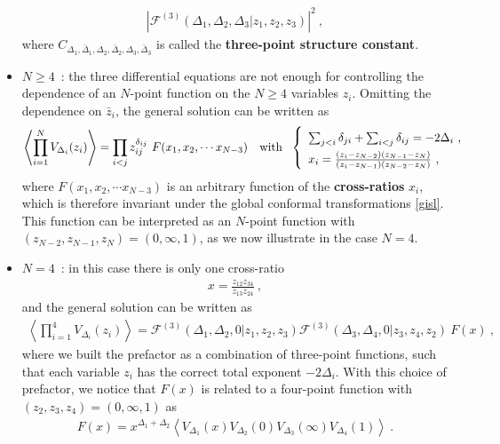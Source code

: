 \documentclass[12pt,a4paper,notitlepage]{report}
\numberwithin{equation}{section}
\theoremstyle{break}
\begin{document}
\begin{itemize}
\begin{align}
 \left|\mathcal{F}^{(3)}(\Delta_1,\Delta_2,\Delta_3|z_1,z_2,z_3)\right|^2\ ,
\label{cff}
\end{align}
where $C_{\Delta_1,\bar{\Delta}_1,\Delta_2,\bar{\Delta}_2,\Delta_3,\bar{\Delta}_3}$ is called the \textbf{\boldmath three-point structure constant}.
\item $\boxed{N\geq 4}$\ : the three differential equations are not enough for controlling the dependence of an $N$-point function on the $N\geq 4$ variables $z_i$.
Omitting the dependence on $\bar{z}_i$, the general solution can be written as 
\begin{align}
 \left\langle\prod_{i=1}^N V_{\Delta_i}(z_i)\right\rangle = \prod_{i<j} z_{ij}^{\delta_{ij}}\ F(x_1,x_2,\cdots x_{N-3}) \quad \text{with} \ \ 
\renewcommand{\arraystretch}{1.5}
\left\{\begin{array}{l}  \sum_{j< i} \delta_{ji} +\sum_{i<j}\delta_{ij} = -2\Delta_i\ ,
\\ x_i = \frac{(z_i-z_{N-2})(z_{N-1}-z_N)}{(z_i-z_{N-1})(z_{N-2}-z_N)}\ , \end{array}\right. 
\label{xfxn}
\end{align}
where $F(x_1,x_2,\cdots x_{N-3})$ is an arbitrary function of the \textbf{\boldmath cross-ratios} $x_i$, which is therefore invariant under the global conformal transformations \eqref{gisl}.
This function can be interpreted as an $N$-point function with $(z_{N-2},z_{N-1},z_N)=(0,\infty,1)$, as we now illustrate in the case $N=4$.
\item $\boxed{N=4}$\ : in this case there is only one cross-ratio 
\begin{align}
 x=\frac{z_{12}z_{34}}{z_{13}z_{24}}\ ,
\label{xe}
\end{align}
and the general solution can be written as 
\begin{align}
 \left\langle\prod_{i=1}^4 V_{\Delta_i}(z_i)\right\rangle = \mathcal{F}^{(3)}(\Delta_1,\Delta_2,0|z_1,z_2,z_3) \mathcal{F}^{(3)}(\Delta_3,\Delta_4,0|z_3,z_4,z_2)\ F(x)\ ,
\label{zgg}
\end{align}
where we built the prefactor as a combination of three-point functions, such that each variable $z_i$ has the correct total exponent $-2\Delta_i$.
With this choice of prefactor, we notice that $F(x)$ is related to a four-point function with $(z_2,z_3,z_4)=(0,\infty,1)$ as
\begin{align}
 F(x) =x^{\Delta_1+\Delta_2} \left\langle V_{\Delta_1}(x)V_{\Delta_2}(0)V_{\Delta_3}(\infty) V_{\Delta_4}(1)\right\rangle \ .
\label{fx}
\end{align}
\end{itemize}
\end{document}
